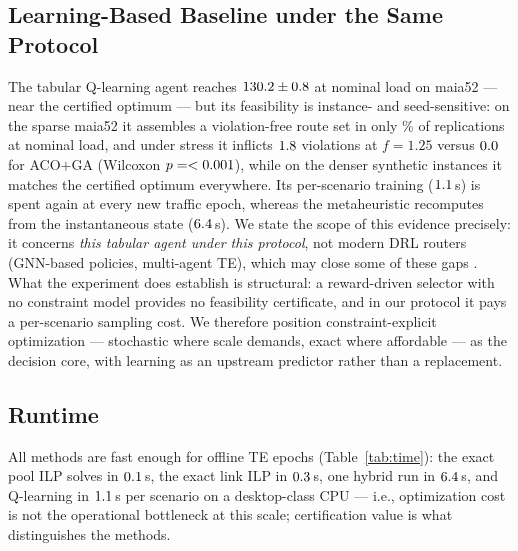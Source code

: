 \documentclass[journal]{IEEEtran}
\begin{document}
\subsection{Learning-Based Baseline under the Same Protocol}
\label{sec:qlb}
The tabular Q-learning agent reaches $130.2\pm0.8$ at nominal
load on maia52 --- near the certified optimum --- but its feasibility is
instance- and seed-sensitive: on the sparse maia52 it assembles a
violation-free route set in only \QlFeasNominal\% of replications at
nominal load, and under stress it inflicts $1.8$ violations at
$f=1.25$ versus $0.0$ for ACO$+$GA (Wilcoxon $p=<0.001$), while
on the denser synthetic instances it matches the certified optimum
everywhere. Its per-scenario training ($1.1$\,s) is spent again
at every new traffic epoch, whereas the metaheuristic recomputes from the
instantaneous state ($6.4$\,s). We state the scope of this evidence
precisely: it concerns \emph{this tabular agent under this protocol}, not
modern DRL routers (GNN-based policies, multi-agent TE), which may close
some of these gaps \cite{xu2018experience,stampa2017drl,almasan2022drl}.
What the experiment does establish is structural: a reward-driven selector
with no constraint model provides no feasibility certificate, and in our
protocol it pays a per-scenario sampling cost. We therefore position
constraint-explicit optimization --- stochastic where scale demands, exact
where affordable --- as the decision core, with learning as an upstream
predictor rather than a replacement.

\subsection{Runtime}
All methods are fast enough for offline TE epochs (Table~\ref{tab:time}):
the exact pool ILP solves in $0.1$\,s, the exact link ILP in
$0.3$\,s, one hybrid run in $6.4$\,s, and Q-learning in
$1.1$\,s per scenario on a desktop-class CPU --- i.e., optimization
cost is not the operational bottleneck at this scale; certification value is
what distinguishes the methods.

\begin{table}[!t]
\caption{Median wall-clock runtime per complete routing decision (s).}
\label{tab:time}
\centering

\end{table}
\end{document}
